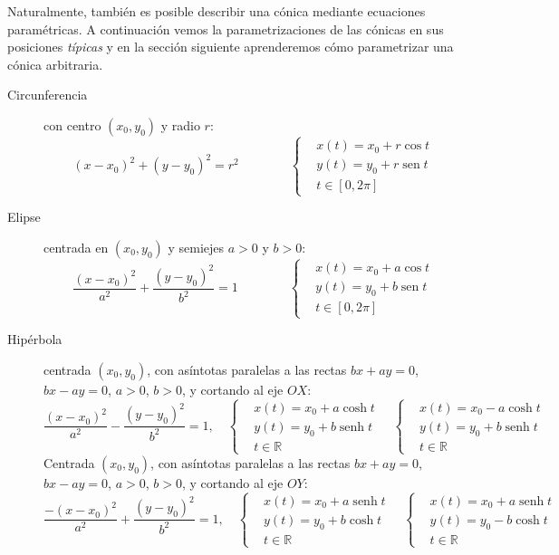 Naturalmente, también es posible describir una cónica mediante ecuaciones paramétricas.
A continuación vemos la parametrizaciones de las cónicas en sus posiciones \emph{típicas} y en la sección siguiente aprenderemos cómo parametrizar una cónica arbitraria.
%
\label{pag:con-tipicas}
%
\begin{description}
\item[Circunferencia]
con centro $(x_0,y_0)$ y radio $r$:
\[
(x-x_0)^2+(y-y_0)^2=r^2 \qquad\qquad
\begin{cases}
& x(t)= x_0 + r \cos t\\
& y(t)= y_0 + r \operatorname{sen} t\\
& t\in[0,2\pi]
\end{cases}\]
\item[Elipse]
centrada en $(x_0,y_0)$ y semiejes $a>0$ y $b>0$:
\[
\frac{(x-x_0)^2}{a^2}+\frac{(y-y_0)^2}{b^2}=1 \qquad\qquad\begin{cases}
& x(t)= x_0 + a \cos t\\
& y(t)= y_0 + b\operatorname{sen} t\\
& t \in[0,2\pi]
\end{cases}\]

\item[Hipérbola] centrada $(x_0,y_0)$,
con asíntotas paralelas a las rectas $bx+ay=0$,\newline
$bx-ay=0$, $a>0$, $b>0$, y cortando al eje $OX$:
\[
\frac{(x-x_0)^2}{a^2}-\frac{(y-y_0)^2}{b^2}=1, \quad\begin{cases}
& x(t)= x_0+a \cosh t\\
& y(t)= y_0+b \operatorname{senh} t\\
& t\in\mathbb{R}
\end{cases}\quad
\begin{cases}
& x(t)= x_0-a \cosh t\\
& y(t)= y_0+b \operatorname{senh} t\\
& t\in\mathbb{R}
\end{cases}\]
Centrada $(x_0,y_0)$, con asíntotas paralelas a las rectas $bx+ay=0$, $bx-ay=0$, $a>0$, $b>0$, y cortando al eje $OY$:
\[
\frac{-(x-x_0)^2}{a^2}+\frac{(y-y_0)^2}{b^2}=1, \quad\begin{cases}
& x(t)= x_0+a \operatorname{senh} t\\
& y(t)= y_0+b \cosh t\\
& t\in\mathbb{R}
\end{cases}\quad
\begin{cases}
& x(t)= x_0+a \operatorname{senh} t\\
& y(t)= y_0-b \cosh t\\
& t\in\mathbb{R}
\end{cases}\]


\end{description}

